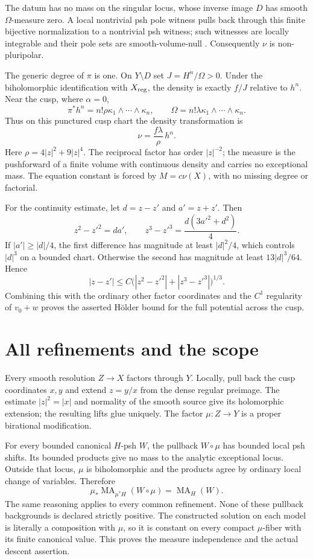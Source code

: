 \documentclass[11pt]{article}
\newcommand{\MA}{\operatorname{MA}}
\newcommand{\Om}{\Omega}
\begin{document}
The datum has no mass on the singular locus, whose inverse image $D$
has smooth $\Om$-measure zero. A local nontrivial psh pole witness pulls
back through this finite bijective normalization to a nontrivial psh
witness; such witnesses are locally integrable and their pole sets are
smooth-volume-null \cite[Chapter I, (5.3) and Theorem (4.17)]{Dem}.
Consequently $\nu$ is non-pluripolar.

The generic degree of $\pi$ is one. On $Y\setminus D$ set
$J=H^n/\Om>0$. Under the biholomorphic identification with $X_{\rm reg}$,
the density is exactly $f/J$ relative to $h^n$.
Near the cusp, where $\alpha=0$,
\[
 \pi^*h^n=n!\rho\kappa_1\wedge\cdots\wedge\kappa_n,
 \qquad \Om=n!\lambda\kappa_1\wedge\cdots\wedge\kappa_n.
\]
Thus on this punctured cusp chart the density transformation is
\[
 \nu=\frac{f\lambda}{\rho}\,h^n.
\]
Here $\rho=4|z|^2+9|z|^4$. The reciprocal factor has order
$|z|^{-2}$; the measure is the pushforward of a finite volume with
continuous density and carries no exceptional mass. The equation constant is forced
by $M=c\nu(X)$, with no missing degree or factorial.

For the continuity estimate, let $d=z-z'$ and $a'=z+z'$. Then
\[
 z^2-z'^2=da',\qquad
 z^3-z'^3=\frac{d(3a'^2+d^2)}4.
\]
If $|a'|\ge|d|/4$, the first difference has magnitude at least
$|d|^2/4$, which controls $|d|^3$ on a bounded chart. Otherwise the
second has magnitude at least $13|d|^3/64$. Hence
\[
 |z-z'|\le C\bigl(|z^2-z'^2|+|z^3-z'^3|\bigr)^{1/3}.
\]
Combining this with the ordinary other factor coordinates and the
$C^1$ regularity of $v_0+w$ proves the asserted H\"older bound for the
full potential across the cusp.

\section{All refinements and the scope}\label{sec:refinements}

Every smooth resolution $Z\to X$ factors through $Y$. Locally, pull back
the cusp coordinates $x,y$ and extend $z=y/x$ from the dense regular
preimage. The estimate $|z|^2=|x|$ and normality of the smooth source
give its holomorphic extension; the resulting lifts glue uniquely.
The factor $\mu:Z\to Y$ is a proper birational modification.

For every bounded canonical $H$-psh $W$, the pullback $W\circ\mu$
has bounded local psh shifts. Its bounded products give no mass to the
analytic exceptional locus. Outside that locus, $\mu$ is biholomorphic
and the products agree by ordinary local change of variables. Therefore
\[
 \mu_*\MA_{\mu^*H}(W\circ\mu)=\MA_H(W).
\]
The same reasoning applies to every common refinement. None of these
pullback backgrounds is declared strictly positive. The constructed
solution on each model is literally a composition with $\mu$, so it
is constant on every compact $\mu$-fiber with its finite canonical value.
This proves the measure independence and the actual descent assertion.
\end{document}
